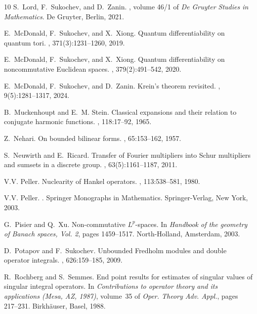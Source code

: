 \documentclass[12pt]{amsart}
\begin{document}
\begin{thebibliography}{10}
S.~Lord, F.~Sukochev, and D.~Zanin.
, volume 46/1 of
  {\em De Gruyter Studies in Mathematics}.
\newblock De Gruyter, Berlin, 2021.

E.~McDonald, F.~Sukochev, and X.~Xiong.
\newblock Quantum differentiability on quantum tori.
, 371(3):1231--1260, 2019.

E.~McDonald, F.~Sukochev, and X.~Xiong.
\newblock Quantum differentiability on noncommutative {E}uclidean spaces.
, 379(2):491--542, 2020.


{\color{blue}E.~McDonald, F.~Sukochev, and D.~Zanin.
\newblock Krein's theorem revisited.
, 9(5):1281--1317, 2024.}


B.~Muckenhoupt and E.~M. Stein.
\newblock Classical expansions and their relation to conjugate harmonic
  functions.
, 118:17--92, 1965.

Z.~Nehari.
\newblock On bounded bilinear forms.
, 65:153--162, 1957.

S.~Neuwirth and E.~Ricard.
\newblock Transfer of {F}ourier multipliers into {S}chur multipliers and
  sumsets in a discrete group.
, 63(5):1161--1187, 2011.

V.V. Peller.
\newblock Nuclearity of {\color{blue}Hankel} operators.
, 113:538--581, 1980.

V.V. Peller.
.
\newblock Springer Monographs in Mathematics. Springer-Verlag, New York, 2003.

G.~Pisier and Q.~Xu.
\newblock Non-commutative {$L^p$}-spaces.
\newblock In {\em Handbook of the geometry of {B}anach spaces, {V}ol. 2}, pages
  1459--1517. North-Holland, Amsterdam, 2003.

D.~Potapov and F.~Sukochev.
\newblock Unbounded {F}redholm modules and double operator integrals.
, 626:159--185, 2009.

R.~Rochberg and S.~Semmes.
\newblock End point results for estimates of singular values of singular
  integral operators.
\newblock In {\em Contributions to operator theory and its applications
  ({M}esa, {AZ}, 1987)}, volume~35 of {\em Oper. Theory Adv. Appl.}, pages
  217--231. Birkh\"{a}user, Basel, 1988.


\end{thebibliography}
\end{document}
